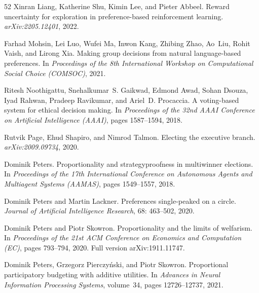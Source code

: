 \documentclass[10pt]{scrartcl}
\theoremstyle{plain}
\theoremstyle{definition}
\begin{document}
\begin{thebibliography}{52}
	Xinran Liang, Katherine Shu, Kimin Lee, and Pieter Abbeel.
	\newblock Reward uncertainty for exploration in preference-based reinforcement
	learning.
	\newblock \emph{arXiv:2205.12401}, 2022.
	
	Farhad Mohsin, Lei Luo, Wufei Ma, Inwon Kang, Zhibing Zhao, Ao~Liu, Rohit
	Vaish, and Lirong Xia.
	\newblock Making group decisions from natural language-based preferences.
	\newblock In \emph{Proceedings of the 8th International Workshop on
		Computational Social Choice (COMSOC)}, 2021.
	
	Ritesh Noothigattu, Snehalkumar~S. Gaikwad, Edmond Awad, Sohan Dsouza, Iyad
	Rahwan, Pradeep Ravikumar, and Ariel~D. Procaccia.
	\newblock A voting-based system for ethical decision making.
	\newblock In \emph{Proceedings of the 32nd AAAI Conference on Artificial
		Intelligence (AAAI)}, pages 1587--1594, 2018.
	
	Rutvik Page, Ehud Shapiro, and Nimrod Talmon.
	\newblock Electing the executive branch.
	\newblock \emph{arXiv:2009.09734}, 2020.
	
	Dominik Peters.
	\newblock Proportionality and strategyproofness in multiwinner elections.
	\newblock In \emph{Proceedings of the 17th International Conference on
		Autonomous Agents and Multiagent Systems (AAMAS)}, pages 1549--1557, 2018.
	
	Dominik Peters and Martin Lackner.
	\newblock Preferences single-peaked on a circle.
	\newblock \emph{Journal of Artificial Intelligence Research}, 68:
	463--502, 2020.
	
	Dominik Peters and Piotr Skowron.
	\newblock Proportionality and the limits of welfarism.
	\newblock In \emph{Proceedings of the 21st ACM Conference on Economics and
		Computation (EC)}, pages 793--794, 2020.
	\newblock Full version arXiv:1911.11747.
	
	Dominik Peters, Grzegorz Pierczy{\'n}ski, and Piotr Skowron.
	\newblock Proportional participatory budgeting with additive utilities.
	\newblock In \emph{Advances in Neural Information Processing Systems},
	volume~34, pages 12726--12737, 2021.
	

\end{thebibliography}
\end{document}
